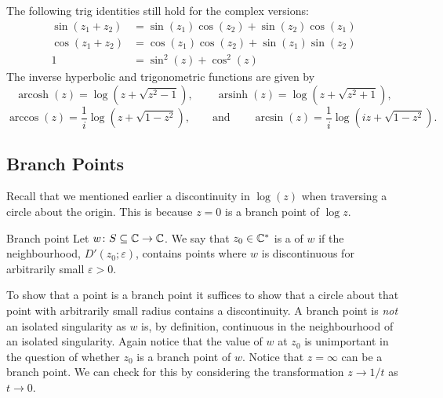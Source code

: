 \documentclass{article}
\DeclareMathOperator{\arcosh}{arcosh}
\DeclareMathOperator{\arsinh}{arsinh}
\newcommand{\discPunctured}[2]{D'\left({#1}; {#2}\right)}
\begin{document}
    The following trig identities still hold for the complex versions:
    \begin{align*}
        \sin(z_1 + z_2) &= \sin(z_1)\cos(z_2) + \sin(z_2)\cos(z_1)\\
        \cos(z_1 + z_2) &= \cos(z_1)\cos(z_2) + \sin(z_1)\sin(z_2)\\
        1 &= \sin^2(z) + \cos^2(z)
    \end{align*}
    The inverse hyperbolic and trigonometric functions are given by
    \[\arcosh(z) = \log\left(z + \sqrt{z^2 - 1}\right), \qquad \arsinh(z) = \log\left(z + \sqrt{z^2 + 1}\right),\]
    \[\arccos(z) = \frac{1}{i}\log\left(z + \sqrt{1 - z^2}\right), \qquad\text{and}\qquad \arcsin(z) = \frac{1}{i}\log\left(iz + \sqrt{1 - z^2}\right).\] 
    
    \subsection{Branch Points}
    Recall that we mentioned earlier a discontinuity in \(\log(z)\) when traversing a circle about the origin.
    This is because \(z = 0\) is a branch point of \(\log z\).
    \begin{definition}{Branch point}{}
        Let \(w\colon S\subseteq\mathbb{C}\to\mathbb{C}\).
        We say that \(z_0\in\mathbb{C}^*\) is a  of \(w\) if the neighbourhood, \(\discPunctured{z_0}{\varepsilon}\), contains points where \(w\) is discontinuous for arbitrarily small \(\varepsilon > 0\).
    \end{definition}
    To show that a point is a branch point it suffices to show that a circle about that point with arbitrarily small radius contains a discontinuity.
    A branch point is \emph{not} an isolated singularity as \(w\) is, by definition, continuous in the neighbourhood of an isolated singularity.
    Again notice that the value of \(w\) at \(z_0\) is unimportant in the question of whether \(z_0\) is a branch point of \(w\).
    Notice that \(z = \infty\) can be a branch point.
    We can check for this by considering the transformation \(z \to 1/t\) as \(t\to 0\).
    
\end{document}

